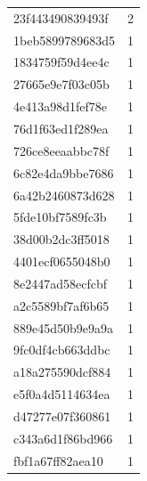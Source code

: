 \begin{tabular}{ll}
23f443490839493f & 2 \\
1beb5899789683d5 & 1 \\
1834759f59d4ee4c & 1 \\
27665e9e7f03c05b & 1 \\
4e413a98d1fef78e & 1 \\
76d1f63ed1f289ea & 1 \\
726ce8eeaabbc78f & 1 \\
6c82e4da9bbe7686 & 1 \\
6a42b2460873d628 & 1 \\
5fde10bf7589fc3b & 1 \\
38d00b2dc3ff5018 & 1 \\
4401ecf0655048b0 & 1 \\
8e2447ad58ecfcbf & 1 \\
a2c5589bf7af6b65 & 1 \\
889e45d50b9e9a9a & 1 \\
9fc0df4cb663ddbc & 1 \\
a18a275590dcf884 & 1 \\
e5f0a4d5114634ea & 1 \\
d47277e07f360861 & 1 \\
c343a6d1f86bd966 & 1 \\
fbf1a67ff82aea10 & 1 \\
\bottomrule
\end{tabular}